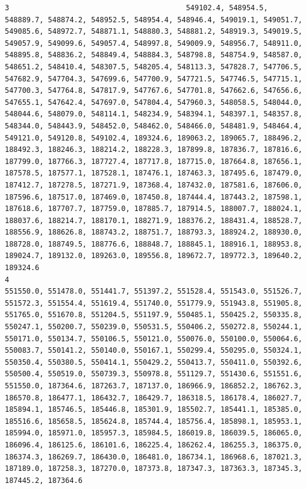 \documentclass[
  letterpaper,
]{scrbook}
\begin{document}
\begin{verbatim}
3                                         549102.4, 548954.5, 548889.7, 548874.2, 548952.5, 548954.4, 548946.4, 549019.1, 549051.7, 549085.6, 548972.7, 548871.1, 548880.3, 548881.2, 548919.3, 549019.5, 549057.9, 549099.6, 549057.4, 548997.8, 549009.9, 548956.7, 548911.0, 548895.8, 548836.2, 548849.4, 548884.3, 548798.8, 548754.9, 548587.0, 548651.2, 548410.4, 548307.5, 548205.4, 548113.3, 547828.7, 547706.5, 547682.9, 547704.3, 547699.6, 547700.9, 547721.5, 547746.5, 547715.1, 547700.3, 547764.8, 547817.9, 547767.6, 547701.8, 547662.6, 547656.6, 547655.1, 547642.4, 547697.0, 547804.4, 547960.3, 548058.5, 548044.0, 548044.6, 548079.0, 548114.1, 548234.9, 548394.1, 548397.1, 548357.8, 548344.0, 548443.9, 548452.0, 548462.0, 548466.0, 548481.9, 548464.4, 549121.0, 549120.8, 549102.4, 189324.6, 189063.2, 189065.7, 188496.2, 188492.3, 188246.3, 188214.2, 188228.3, 187899.8, 187836.7, 187816.6, 187799.0, 187766.3, 187727.4, 187717.8, 187715.0, 187664.8, 187656.1, 187578.5, 187577.1, 187528.1, 187476.1, 187463.3, 187495.6, 187479.0, 187412.7, 187278.5, 187271.9, 187368.4, 187432.0, 187581.6, 187606.0, 187596.6, 187517.0, 187469.0, 187450.8, 187444.4, 187443.2, 187598.1, 187618.6, 187707.7, 187759.0, 187885.7, 187914.5, 188007.7, 188024.1, 188037.6, 188214.7, 188170.1, 188271.9, 188376.2, 188431.4, 188528.7, 188556.9, 188626.8, 188743.2, 188751.7, 188793.3, 188924.2, 188930.0, 188728.0, 188749.5, 188776.6, 188848.7, 188845.1, 188916.1, 188953.8, 189024.7, 189132.0, 189263.0, 189556.8, 189672.7, 189772.3, 189640.2, 189324.6
4                                                                                                                                                                                                                                                                                                                                                                                                                 551550.0, 551478.0, 551441.7, 551397.2, 551528.4, 551543.0, 551526.7, 551572.3, 551554.4, 551619.4, 551740.0, 551779.9, 551943.8, 551905.8, 551765.0, 551670.8, 551204.5, 551197.9, 550485.1, 550425.2, 550335.8, 550247.1, 550200.7, 550239.0, 550531.5, 550406.2, 550272.8, 550244.1, 550171.0, 550134.7, 550106.5, 550121.0, 550076.0, 550100.0, 550064.6, 550083.7, 550141.2, 550140.0, 550167.1, 550299.4, 550295.0, 550324.1, 550350.4, 550380.5, 550414.1, 550429.2, 550413.7, 550411.0, 550392.6, 550500.4, 550519.0, 550739.3, 550978.8, 551129.7, 551430.6, 551551.6, 551550.0, 187364.6, 187263.7, 187137.0, 186966.9, 186852.2, 186762.3, 186570.8, 186477.1, 186432.7, 186429.7, 186318.5, 186178.4, 186027.7, 185894.1, 185746.5, 185446.8, 185301.9, 185502.7, 185441.1, 185385.0, 185516.6, 185658.5, 185624.8, 185744.4, 185756.4, 185898.1, 185953.1, 185994.0, 185971.0, 185957.3, 185984.5, 186019.8, 186039.5, 186065.0, 186096.4, 186125.6, 186101.6, 186225.4, 186262.4, 186255.3, 186375.0, 186374.3, 186269.7, 186430.0, 186481.0, 186734.1, 186968.6, 187021.3, 187189.0, 187258.3, 187270.0, 187373.8, 187347.3, 187363.3, 187345.3, 187445.2, 187364.6

\end{verbatim}
\end{document}
